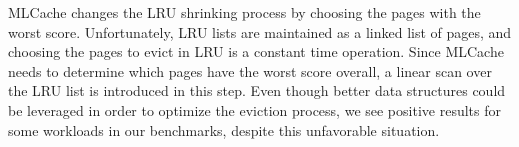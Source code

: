 MLCache changes the LRU shrinking process by choosing the pages with the worst score. Unfortunately,
LRU lists are maintained as a linked list of pages, and choosing the pages to evict in LRU is a
constant time operation. Since MLCache needs to determine which pages have the worst score overall,
a linear scan over the LRU list is introduced in this step. Even though better data structures could
be leveraged in order to optimize the eviction process, we see positive results for some workloads
in our benchmarks, despite this unfavorable situation.
